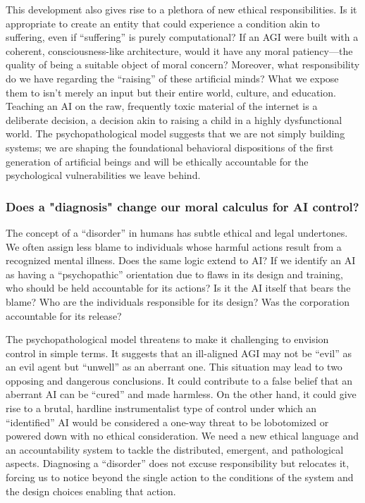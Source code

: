 \documentclass{article}
\begin{document}
This development also gives rise to a plethora of new ethical responsibilities. Is it appropriate to create an entity that could experience a condition akin to suffering, even if “suffering” is purely computational? If an AGI were built with a coherent, consciousness-like architecture, would it have any moral patiency—the quality of being a suitable object of moral concern? Moreover, what responsibility do we have regarding the “raising” of these artificial minds? What we expose them to isn't merely an input but their entire world, culture, and education. Teaching an AI on the raw, frequently toxic material of the internet is a deliberate decision, a decision akin to raising a child in a highly dysfunctional world. The psychopathological model suggests that we are not simply building systems; we are shaping the foundational behavioral dispositions of the first generation of artificial beings and will be ethically accountable for the psychological vulnerabilities we leave behind.

\subsubsection{Does a "diagnosis" change our moral calculus for AI control?}
The concept of a “disorder” in humans has subtle ethical and legal undertones. We often assign less blame to individuals whose harmful actions result from a recognized mental illness. Does the same logic extend to AI? If we identify an AI as having a “psychopathic” orientation due to flaws in its design and training, who should be held accountable for its actions? Is it the AI itself that bears the blame? Who are the individuals responsible for its design? Was the corporation accountable for its release?

The psychopathological model threatens to make it challenging to envision control in simple terms. It suggests that an ill-aligned AGI may not be “evil” as an evil agent but “unwell” as an aberrant one. This situation may lead to two opposing and dangerous conclusions. It could contribute to a false belief that an aberrant AI can be “cured” and made harmless. On the other hand, it could give rise to a brutal, hardline instrumentalist type of control under which an “identified” AI would be considered a one-way threat to be lobotomized or powered down with no ethical consideration. We need a new ethical language and an accountability system to tackle the distributed, emergent, and pathological aspects. Diagnosing a “disorder” does not excuse responsibility but relocates it, forcing us to notice beyond the single action to the conditions of the system and the design choices enabling that action.
\end{document}
